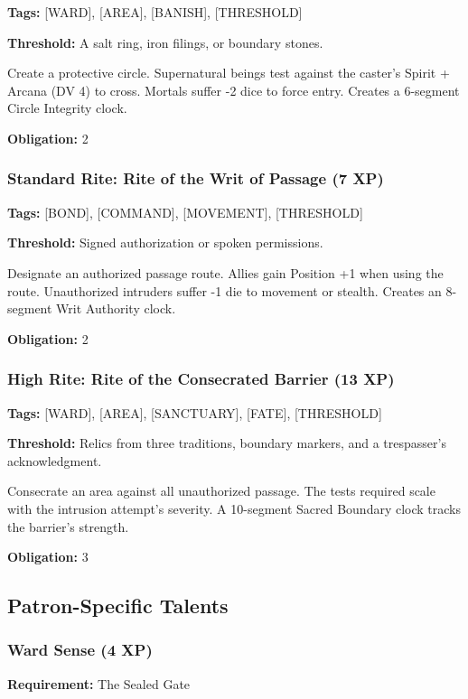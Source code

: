 \textbf{Tags:} [WARD], [AREA], [BANISH], [THRESHOLD]

\textbf{Threshold:} A salt ring, iron filings, or boundary stones.

Create a protective circle. Supernatural beings test against the caster's Spirit + Arcana (DV 4) to cross. Mortals suffer -2 dice to force entry. Creates a 6-segment Circle Integrity clock.

\textbf{Obligation:} 2

\subsubsection{Standard Rite: Rite of the Writ of Passage (7 XP)}

\textbf{Tags:} [BOND], [COMMAND], [MOVEMENT], [THRESHOLD]

\textbf{Threshold:} Signed authorization or spoken permissions.

Designate an authorized passage route. Allies gain Position +1 when using the route. Unauthorized intruders suffer -1 die to movement or stealth. Creates an 8-segment Writ Authority clock.

\textbf{Obligation:} 2

\subsubsection{High Rite: Rite of the Consecrated Barrier (13 XP)}

\textbf{Tags:} [WARD], [AREA], [SANCTUARY], [FATE], [THRESHOLD]

\textbf{Threshold:} Relics from three traditions, boundary markers, and a trespasser's acknowledgment.

Consecrate an area against all unauthorized passage. The tests required scale with the intrusion attempt's severity. A 10-segment Sacred Boundary clock tracks the barrier's strength.

\textbf{Obligation:} 3

\subsection{Patron-Specific Talents}

\subsubsection{Ward Sense (4 XP)}

\textbf{Requirement:} The Sealed Gate


